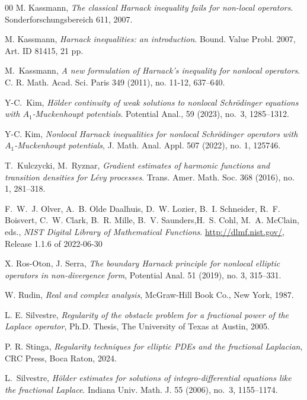 \documentclass[a4paper,12pt,reqno]{amsart}
\numberwithin{equation}{section}
\theoremstyle{definition}
\theoremstyle{notation}
\begin{document}
\begin{thebibliography}{00}
M. Kassmann, \emph{The classical Harnack inequality fails for non-local operators}. Sonderforschungsbereich 611, 2007.


M. Kassmann, \emph{Harnack inequalities: an introduction}.
Bound. Value Probl. 2007, Art. ID 81415, 21 pp.


M.~Kassmann, \emph{A new formulation of Harnack's inequality for nonlocal operators}. C. R. Math. Acad. Sci. Paris 349 (2011), no. 11-12, 637--640.




Y-C.~Kim,
\emph{H\"{o}lder continuity of weak solutions to 
nonlocal {S}chr\"odinger equations with $A_1$-Muckenhoupt potentials}.
Potential Anal., 59 (2023), no.~3, 1285--1312.


Y-C. Kim, \emph{Nonlocal {H}arnack inequalities for 
nonlocal {S}chr\"odinger operators with {$A_1$}-{M}uckenhoupt potentials}, 
J. Math. Anal. Appl. 507 (2022), no. 1, 125746.


T.~Kulczycki, M.~Ryznar, \emph{Gradient estimates of harmonic functions and transition densities for L\'evy processes}.
Trans. Amer. Math. Soc. 368 (2016), no. 1, 281--318.


F.~W.~J. Olver, A.~B. Olde Daalhuis, D.~W. Lozier, B.~I. Schneider, R.~F. Boisvert, C.~W. Clark, B.~R. Mille, B.~V. Saunders,H.~S. Cohl, M.~A. McClain, eds., \emph{NIST Digital Library of Mathematical Functions}.
\url{http://dlmf.nist.gov/}, Release 1.1.6 of 2022-06-30


X. Ros-Oton, J. Serra, \emph{The boundary {H}arnack principle for nonlocal elliptic operators in non-divergence form},
Potential Anal. 51 (2019), no. 3, 315--331.


W. Rudin, \emph{Real and complex analysis},
McGraw-Hill Book Co., New York, 1987.


L. E. Silvestre, \emph{Regularity of the obstacle problem for a fractional power of the Laplace operator}, Ph.D. Thesis,
The University of Texas at Austin, 2005.


 P. R. Stinga, \emph{Regularity techniques for elliptic PDEs and the fractional Laplacian}, CRC Press,
Boca Raton, 2024.


L.~Silvestre, \emph{H\"older estimates for solutions of integro-differential equations like the fractional Laplace}. Indiana Univ. Math. J. 55 (2006), no.~3, 1155--1174.



\end{thebibliography}
\end{document}
